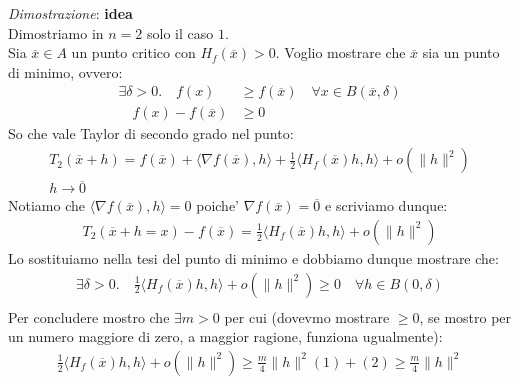 \documentclass{article}
\begin{document}
\noindent \emph{Dimostrazione}: \textbf{idea} \\
Dimostriamo in $n=2$ solo il caso $1$. \\
Sia $\overline{x} \in A$ un punto critico con $H_f(\overline{x}) > 0$.
Voglio mostrare che $\overline{x}$ sia un punto di minimo, ovvero:
\begin{align*}
  \exists \delta > 0. \quad f(x) &\geq f(\overline{x}) \quad \forall x \in B(\overline{x}, \delta) \\
  \quad f(x) - f(\overline{x}) &\geq 0
\end{align*}
So che vale Taylor di secondo grado nel punto:
\begin{align*}
  T_2(\overline{x} + h) = f(\overline{x}) + \langle \nabla f(\overline{x}), h \rangle
  + \frac{1}{2} \langle H_f(\overline{x})h, h \rangle + o(\|h\|^2) \\
  h \to \overline{0}
\end{align*}
Notiamo che $\langle \nabla f(\overline{x}), h \rangle = 0$ poiche' $\nabla f(\overline{x}) = \overline{0}$ e scriviamo dunque:
\begin{align*}
  T_2(\overline{x} + h = x) - f(\overline{x}) = \frac{1}{2} \langle H_f(\overline{x}) h, h \rangle + o(\|h\|^2)
\end{align*}
Lo sostituiamo nella tesi del punto di minimo e dobbiamo dunque mostrare che:
\begin{align*}
  \exists \delta > 0. \quad
  \frac{1}{2} \langle H_f(\overline{x}) h, h \rangle + o(\|h\|^2) \geq 0 \quad \forall h \in B(0, \delta) \\
\end{align*}
Per concludere mostro che $\exists m > 0$ per cui (dovevmo mostrare $\geq 0$, se mostro
per un numero maggiore di zero, a maggior ragione, funziona ugualmente):
\begin{align*}
  \frac{1}{2} \langle H_f(\overline{x}) h, h \rangle + o(\|h\|^2) \geq \frac{m}{4} \|h\|^2
  (1) + (2) \geq \frac{m}{4} \|h\|^2
\end{align*}
\end{document}
